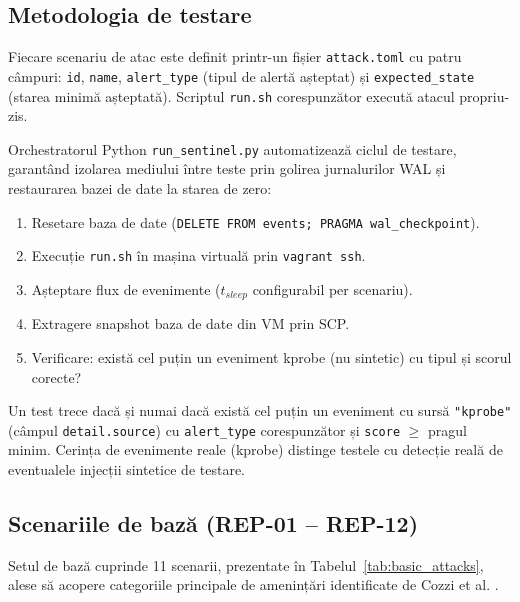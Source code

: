 \subsection{Metodologia de testare}
\label{subsec:test_method}

\par Fiecare scenariu de atac este definit printr-un fișier \texttt{attack.toml} cu patru câmpuri: \texttt{id}, \texttt{name}, \texttt{alert\_type} (tipul de alertă așteptat) și \texttt{expected\_state} (starea minimă așteptată). Scriptul \texttt{run.sh} corespunzător execută atacul propriu-zis.

\par Orchestratorul Python \texttt{run\_sentinel.py} automatizează ciclul de testare, garantând izolarea mediului între teste prin golirea jurnalurilor WAL și restaurarea bazei de date la starea de zero:

\begin{enumerate}
    \item Resetare baza de date (\texttt{DELETE FROM events; PRAGMA wal\_checkpoint}).
    \item Execuție \texttt{run.sh} în mașina virtuală prin \texttt{vagrant ssh}.
    \item Așteptare flux de evenimente ($t_{sleep}$ configurabil per scenariu).
    \item Extragere snapshot baza de date din VM prin SCP.
    \item Verificare: există cel puțin un eveniment kprobe (nu sintetic) cu tipul și scorul corecte?
\end{enumerate}

\par Un test trece dacă și numai dacă există cel puțin un eveniment cu sursă \texttt{"kprobe"} (câmpul \texttt{detail.source}) cu \texttt{alert\_type} corespunzător și \texttt{score} $\geq$ pragul minim. Cerința de evenimente reale (kprobe) distinge testele cu detecție reală de eventualele injecții sintetice de testare.

\subsection{Scenariile de bază (REP-01 -- REP-12)}
\label{subsec:basic_attacks}

\par Setul de bază cuprinde 11 scenarii, prezentate în Tabelul~\ref{tab:basic_attacks}, alese să acopere categoriile principale de amenințări identificate de Cozzi et al. \cite{Cozzi2018}.

